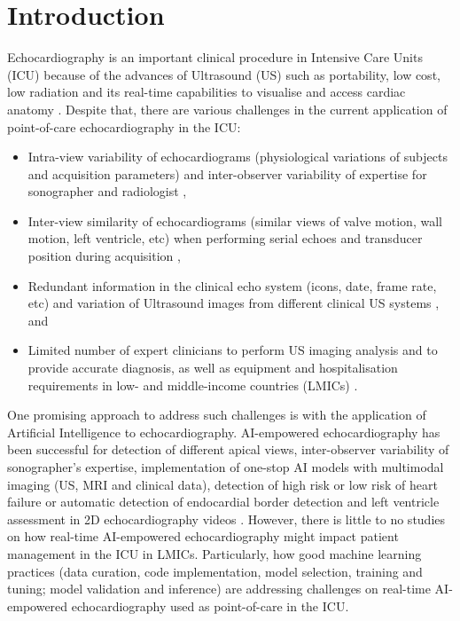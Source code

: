 \documentclass[mlabstract,twocolumn]{jmlr}
\begin{document}
\section{Introduction}
\label{sec:intro}
Echocardiography is an important clinical procedure in Intensive Care Units (ICU) because of the advances of Ultrasound (US) such as portability, low cost, low radiation and its real-time capabilities to visualise and access cardiac anatomy \citep{Feigenbaum1996, Vieillard-Baron2008, singh2007, cambell2018}.
Despite that, there are various challenges in the current application of point-of-care echocardiography in the ICU:
\begin{itemize}
\setlength\itemsep{0em}
\item Intra-view variability of echocardiograms (physiological variations of subjects and acquisition parameters) and inter-observer variability of expertise for sonographer and radiologist \citep{khamis2017, Feigenbaum1996, field2011},
\item Inter-view similarity of echocardiograms (similar views of valve motion, wall motion, left ventricle, etc) when performing serial echoes and transducer position during acquisition \citep{zhang2018},
\item Redundant information in the clinical echo system (icons, date, frame rate, etc) \citep{khamis2017} and variation of Ultrasound images from different clinical US systems \citep{brindise2020unsupervised}, and
\item Limited number of expert clinicians to perform US imaging analysis and to provide accurate diagnosis, as well as equipment and hospitalisation requirements in low- and middle-income countries (LMICs) \citep{hao2021-wellcome, 2021-huyNhat-vanHao-in-FAIR-MICCAI}.
\end{itemize}
One promising approach to address such challenges is with the application of Artificial Intelligence to echocardiography.
AI-empowered echocardiography has been successful for detection of different apical views, inter-observer variability of sonographer's expertise, implementation of one-stop AI models with multimodal imaging (US, MRI and clinical data), detection of high risk or low risk of heart failure or automatic detection of endocardial border detection and left ventricle assessment in 2D echocardiography videos \citep{tromp2022, zhang2022-mdpi, behnami2020, ono2022}.
However, there is little to no studies on how real-time AI-empowered echocardiography might impact patient management in the ICU in LMICs.
Particularly, how good machine learning practices (data curation, code implementation, model selection, training and tuning; model validation and inference) are addressing challenges on real-time AI-empowered echocardiography used as point-of-care in the ICU.
\end{document}
